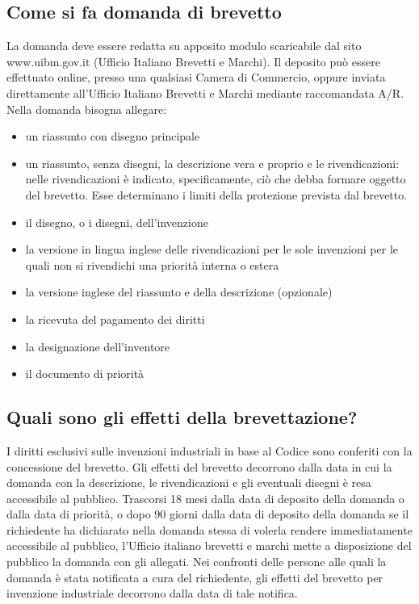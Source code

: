\subsection{Come si fa domanda di brevetto}
La domanda deve essere redatta su apposito modulo scaricabile dal sito www.uibm.gov.it (Ufficio Italiano Brevetti e Marchi). Il deposito può essere effettuato online, presso una
qualsiasi Camera di Commercio, oppure inviata direttamente all'Ufficio Italiano Brevetti e Marchi mediante raccomandata A/R.\newline
Nella domanda bisogna allegare:
\begin{itemize}
    \item un riassunto con disegno principale
    \item un riassunto, senza disegni, la descrizione vera e proprio e le rivendicazioni: \newline
    nelle rivendicazioni è indicato, specificamente, ciò che debba formare oggetto del brevetto. Esse determinano i limiti
    della protezione prevista dal brevetto.
    \item il disegno, o i disegni, dell'invenzione
    \item la versione in lingua inglese delle rivendicazioni per le sole invenzioni per le quali non si
    rivendichi una priorità interna o estera
    \item la versione inglese del riassunto e della descrizione (opzionale)
    \item la ricevuta del pagamento dei diritti
    \item la designazione dell'inventore
    \item il documento di priorità
\end{itemize}

\subsection{Quali sono gli effetti della brevettazione?}
I diritti esclusivi sulle invenzioni industriali in base al Codice sono conferiti con la concessione del brevetto. \newline
Gli effetti del brevetto decorrono dalla data in cui la domanda con la descrizione, le rivendicazioni e gli eventuali disegni è resa accessibile al pubblico.\newline
Trascorsi 18 mesi dalla data di deposito della domanda o dalla data di priorità, o dopo 90 giorni dalla data di deposito della domanda se il
richiedente ha dichiarato nella domanda stessa di volerla rendere immediatamente accessibile al pubblico, l'Ufficio italiano brevetti e marchi mette a disposizione del
pubblico la domanda con gli allegati. \newline
Nei confronti delle persone alle quali la domanda è stata notificata a cura del richiedente, gli effetti del brevetto per invenzione
industriale decorrono dalla data di tale notifica.

